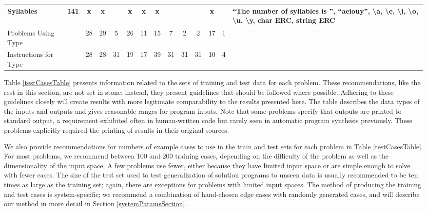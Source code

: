 \documentclass{sig-alternate}
\begin{document}
\begin{table*}
\begin{tabular}{|>{\raggedright}p{3.1cm}|c|ccccccccccc|>{\raggedright}p{5.5cm}|}
\hline
Syllables                  & 141             & x    & x       &       & x       & x    & x      &                    &                  &                   & x     &            & ``The number of syllables is '', ``aeiouy'', \textbackslash a, \textbackslash e, \textbackslash i, \textbackslash o, \textbackslash u, \textbackslash y, char ERC, string ERC                                                   \tabularnewline
\hline
\hline
Problems Using Type                      &                 & 28   & 29      & 5     & 26      & 11   & 15     & 7                  & 2                & 2                 & 17    & 1          &                                                                                                                                                                                                                             \tabularnewline
\hline
Instructions for Type     &                 & 28   & 28      & 31    & 19      & 17   & 39     & 31                 & 31               & 31                & 10    & 4          &                                                                                                                                                                                                                             \tabularnewline
\hline
\end{tabular}
\end{table*}

Table \ref{testCasesTable} presents information related to the sets of training and test data for each problem. These recommendations, like the rest in this section, are not set in stone; instead, they present guidelines that should be followed where possible. Adhering to these guidelines closely will create results with more legitimate comparability to the results presented here. The table describes the data types of the inputs and outputs and gives reasonable ranges for program inputs. Note that some problems specify that outputs are printed to standard output, a requirement exhibited often in human-written code but rarely seen in automatic program synthesis previously. These problems explicitly required the printing of results in their original sources.

We also provide recommendations for numbers of example cases to use in the train and test sets for each problem in Table \ref{testCasesTable}. For most problems, we recommend between 100 and 200 training cases, depending on the difficulty of the problem as well as the dimensionality of the input space. A few problems use fewer, either because they have limited input space or are simple enough to solve with fewer cases. The size of the test set used to test generalization of solution programs to unseen data is usually recommended to be ten times as large as the training set; again, there are exceptions for problems with limited input spaces. The method of producing the training and test cases is system-specific; we recommend a combination of hand-chosen edge cases with randomly generated cases, and will describe our method in more detail in Section \ref{systemParamsSection}.
\end{document}
